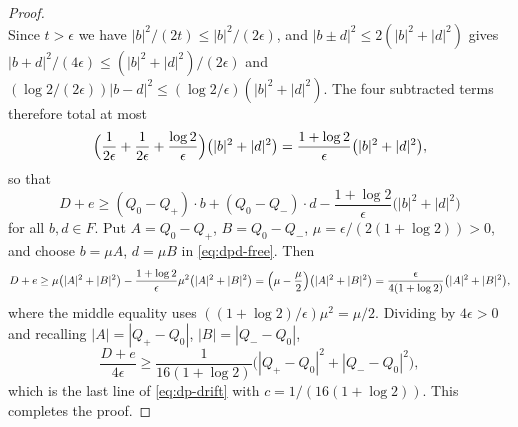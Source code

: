 \begin{proof}
\[\]
Since $t>\epsilon$ we have $|b|^2/(2t)\le|b|^2/(2\epsilon)$, and
$|b\pm d|^2\le2(|b|^2+|d|^2)$ gives
$|b+d|^2/(4\epsilon)\le(|b|^2+|d|^2)/(2\epsilon)$ and
$(\log2/(2\epsilon))|b-d|^2\le(\log2/\epsilon)(|b|^2+|d|^2)$. The four
subtracted terms therefore total at most
\[
  \Bigl(\frac{1}{2\epsilon}+\frac{1}{2\epsilon}+\frac{\log2}{\epsilon}\Bigr)
     \bigl(|b|^2+|d|^2\bigr)
  =\frac{1+\log2}{\epsilon}\bigl(|b|^2+|d|^2\bigr),
\]
so that
\begin{equation}\label{eq:dpd-free}
  D+e\ge(Q_0-Q_+)\cdot b+(Q_0-Q_-)\cdot d
     -\frac{1+\log2}{\epsilon}\bigl(|b|^2+|d|^2\bigr)
\end{equation}
for all $b,d\in F$. Put $A=Q_0-Q_+$, $B=Q_0-Q_-$,
$\mu=\epsilon/(2(1+\log2))>0$, and choose $b=\mu A$, $d=\mu B$ in
\eqref{eq:dpd-free}. Then
\[
  D+e\ge\mu\bigl(|A|^2+|B|^2\bigr)
     -\frac{1+\log2}{\epsilon}\mu^2\bigl(|A|^2+|B|^2\bigr)
   =\Bigl(\mu-\frac{\mu}{2}\Bigr)\bigl(|A|^2+|B|^2\bigr)
   =\frac{\epsilon}{4(1+\log2)}\bigl(|A|^2+|B|^2\bigr),
\]
where the middle equality uses
$((1+\log2)/\epsilon)\mu^2=\mu/2$. Dividing by $4\epsilon>0$ and recalling
$|A|=|Q_+-Q_0|$, $|B|=|Q_--Q_0|$,
\[
  \frac{D+e}{4\epsilon}
   \ge\frac{1}{16(1+\log2)}\bigl(|Q_+-Q_0|^2+|Q_--Q_0|^2\bigr),
\]
which is the last line of \eqref{eq:dp-drift} with $c=1/(16(1+\log2))$. This
completes the proof.
\end{proof}
